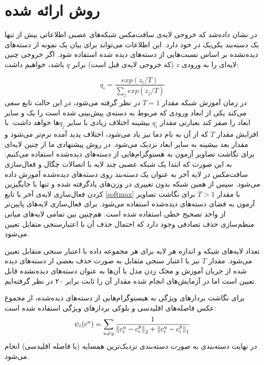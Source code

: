 \section{روش ارائه شده}\label{proposed}
در
\cite{hint14} 
 نشان داده‌شد که خروجی لایه‌ی سافت‌مکس 
شبکه‌های عصبی اطلاعاتی بیش از تنها یک دسته‌بند یکی‌یک در خود دارد. این اطلاعات می‌تواند برای بیان یک نمونه از دسته‌های دیده‌نشده بر اساس نسبت‌هایی از دسته‌های دیده شده استفاده شود. اگر خروجی چنین لایه‌ای را به ورودی $z$ (که خروجی لایه‌ی قبل است) برابر $q$ باشد، خواهیم داشت:
 
\begin{equation} \label{softmax}
	q_i = \frac{exp(z_i/T)}{\sum_j exp(z_j/T)}
\end{equation}
در زمان آموزش شبکه مقدار $T=1$ در نظر گرفته می‌شود، در این حالت تابع سعی می‌کند یکی از ابعاد ورودی که مربوط به دسته‌ی پیش‌بینی شده است را یک و سایر ابعاد را صفر کند بعبارتی مقدار $q_i$ بیشینه اختلاف زیادی با سایر $q_j$ها خواهد داشت. با افزایش مقدار $T$ که از آن به نام دما نیز یاد می‌شود، اختلاف پدید آمده نرم‌تر می‌شود و مقدار بعد بیشینه به سایر ابعاد نزدیک می‌شود. در روش پیشنهادی ما از چنین لایه‌ای برای نگاشت تصاویر آزمون به هستوگرام‌هایی از دسته‌های دیده‌شده استفاده می‌کنیم. به این صورت که ابتدا یک شبکه‌ عصبی چند لایه با اتصالات چگال و فعال‌سازی
 سافت‌مکس در لایه آخر به عنوان یک دسته‌بند روی دسته‌های دیده‌شده آموزش داده می‌شود. سپس از همین شبکه بدون تغییری در وزن‌های یادگرفته شده و تنها با جایگیزین کردن فعال‌سازی لایه‌ی آخر با تابع \eqref{softmax} با مقدار  $T>1$ برای نگاشت تصاویر آزمون به فضای دسته‌های دیده‌شده استفاده می‌شود.
برای فعال‌سازی لایه‌های پایین‌تر از واحد تصحیح خطی
 استفاده شده است. هم‌چنین بین تمامی لایه‌های میانی منظم‌سازی حذف تصادفی
وجود دارد که احتمال حذف آن با اعتبارسنجی متقابل تعیین می‌شود.

  تعداد لایه‌های شبکه و اندازه هر لایه برای هر مجموعه داده با اعتبار سنجی متقابل
  تعیین می‌شود.
  مقدار $T$ نیز  با اعتبار سنجی متقابل به صورت حذف بعضی از دسته‌های دیده شده از جریان آموزش و محک زدن مدل با آن‌ها به عنوان دسته‌های دیده‌نشده قابل تعیین است اما در آزمایش‌های انجام شده مقدار آن را ثابت برابر ۲۰ در نظر گرفته‌ایم. 
 
 برای نگاشت بردارهای ویژگی به هیستوگرام‌هایی از دسته‌های دیده‌شده، از مجموع  عکس فاصله‌های اقلیدسی و بلوکی
  بردارهای ویژگی استفاده شده است:
 \begin{equation} 
\psi_i(c^u) = \sum_{u \neq y} \frac{1}{\left \lVert c_i^u - c_i^y \right \rVert_2 + \left \lVert c_i^u - c_i^y \right \rVert_1}
\end{equation}
در نهایت دسته‌بندی به صورت دسته‌بندی نزدیک‌ترین همسایه (با فاصله اقلیدسی) انجام می‌شود.


